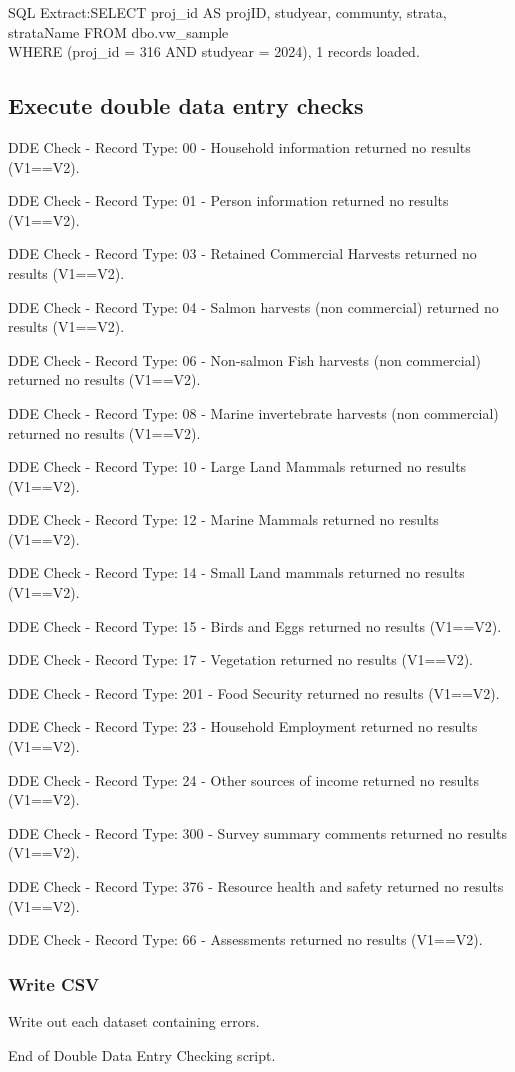 \documentclass[
]{article}
\begin{document}
SQL Extract:SELECT proj\_id AS projID, studyear, communty, strata,
strataName FROM dbo.vw\_sample\\
WHERE (proj\_id = 316 AND studyear = 2024), 1 records loaded.

\subsection{Execute double data entry
checks}\label{execute-double-data-entry-checks}

DDE Check - Record Type: 00 - Household information returned no results
(V1==V2).

DDE Check - Record Type: 01 - Person information returned no results
(V1==V2).

DDE Check - Record Type: 03 - Retained Commercial Harvests returned no
results (V1==V2).

DDE Check - Record Type: 04 - Salmon harvests (non commercial) returned
no results (V1==V2).

DDE Check - Record Type: 06 - Non-salmon Fish harvests (non commercial)
returned no results (V1==V2).

DDE Check - Record Type: 08 - Marine invertebrate harvests (non
commercial) returned no results (V1==V2).

DDE Check - Record Type: 10 - Large Land Mammals returned no results
(V1==V2).

DDE Check - Record Type: 12 - Marine Mammals returned no results
(V1==V2).

DDE Check - Record Type: 14 - Small Land mammals returned no results
(V1==V2).

DDE Check - Record Type: 15 - Birds and Eggs returned no results
(V1==V2).

DDE Check - Record Type: 17 - Vegetation returned no results (V1==V2).

DDE Check - Record Type: 201 - Food Security returned no results
(V1==V2).

DDE Check - Record Type: 23 - Household Employment returned no results
(V1==V2).

DDE Check - Record Type: 24 - Other sources of income returned no
results (V1==V2).

DDE Check - Record Type: 300 - Survey summary comments returned no
results (V1==V2).

DDE Check - Record Type: 376 - Resource health and safety returned no
results (V1==V2).

DDE Check - Record Type: 66 - Assessments returned no results (V1==V2).

\subsubsection{Write CSV}\label{write-csv}

Write out each dataset containing errors.

End of Double Data Entry Checking script.
\end{document}

